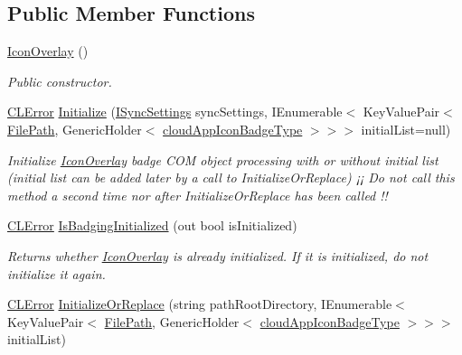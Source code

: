 \subsection*{Public Member Functions}
\begin{DoxyCompactItemize}
\item 
\hyperlink{class_cloud_api_public_1_1_badge_n_e_t_1_1_icon_overlay_acb409bfe425cc155adbd426cf566f87f}{Icon\-Overlay} ()
\begin{DoxyCompactList}\small\item\em Public constructor. \end{DoxyCompactList}\item 
\hyperlink{class_cloud_api_public_1_1_model_1_1_c_l_error}{C\-L\-Error} \hyperlink{class_cloud_api_public_1_1_badge_n_e_t_1_1_icon_overlay_ae53ea5c1723b2220559f9b0aeb6c7048}{Initialize} (\hyperlink{interface_cloud_api_public_1_1_interfaces_1_1_i_sync_settings}{I\-Sync\-Settings} sync\-Settings, I\-Enumerable$<$ Key\-Value\-Pair$<$ \hyperlink{class_cloud_api_public_1_1_model_1_1_file_path}{File\-Path}, Generic\-Holder$<$ \hyperlink{namespace_cloud_api_public_1_1_badge_n_e_t_afab91a750338fef6bd4ef08f5381c4e4}{cloud\-App\-Icon\-Badge\-Type} $>$$>$$>$ initial\-List=null)
\begin{DoxyCompactList}\small\item\em Initialize \hyperlink{class_cloud_api_public_1_1_badge_n_e_t_1_1_icon_overlay}{Icon\-Overlay} badge C\-O\-M object processing with or without initial list (initial list can be added later by a call to Initialize\-Or\-Replace) ¡¡ Do not call this method a second time nor after Initialize\-Or\-Replace has been called !! \end{DoxyCompactList}\item 
\hyperlink{class_cloud_api_public_1_1_model_1_1_c_l_error}{C\-L\-Error} \hyperlink{class_cloud_api_public_1_1_badge_n_e_t_1_1_icon_overlay_a3e729d27b518e1d469e48af8abad7ee9}{Is\-Badging\-Initialized} (out bool is\-Initialized)
\begin{DoxyCompactList}\small\item\em Returns whether \hyperlink{class_cloud_api_public_1_1_badge_n_e_t_1_1_icon_overlay}{Icon\-Overlay} is already initialized. If it is initialized, do not initialize it again. \end{DoxyCompactList}\item 
\hyperlink{class_cloud_api_public_1_1_model_1_1_c_l_error}{C\-L\-Error} \hyperlink{class_cloud_api_public_1_1_badge_n_e_t_1_1_icon_overlay_a53416d509130e2ad22a6c745fcbd1d83}{Initialize\-Or\-Replace} (string path\-Root\-Directory, I\-Enumerable$<$ Key\-Value\-Pair$<$ \hyperlink{class_cloud_api_public_1_1_model_1_1_file_path}{File\-Path}, Generic\-Holder$<$ \hyperlink{namespace_cloud_api_public_1_1_badge_n_e_t_afab91a750338fef6bd4ef08f5381c4e4}{cloud\-App\-Icon\-Badge\-Type} $>$$>$$>$ initial\-List)

\end{DoxyCompactItemize}
